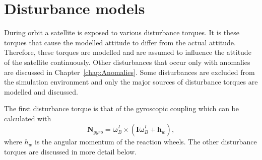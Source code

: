 %	
%
%	

\section{Disturbance models}
\label{section: disturbance models}
During orbit a satellite is exposed to various disturbance torques. It is these torques that cause the modelled attitude to differ from the actual attitude. Therefore, these torques are modelled and are assumed to influence the attitude of the satellite continuously. Other disturbances that occur only with anomalies are discussed in Chapter~\ref{chap:Anomalies}. Some disturbances are excluded from the simulation environment and only the major sources of disturbance torques are modelled and discussed.

The first disturbance torque is that of the gyroscopic coupling which can be calculated with
\begin{equation}
\mathbf{N}_{gyro} = \boldsymbol{\dot{\omega}}_B^I \times (\mathbf{I}\boldsymbol{\dot{\omega}}_B^I + \mathbf{h}_w),
\end{equation}
where $h_w$ is the angular momentum of the reaction wheels. The other disturbance torques are discussed in more detail below.

